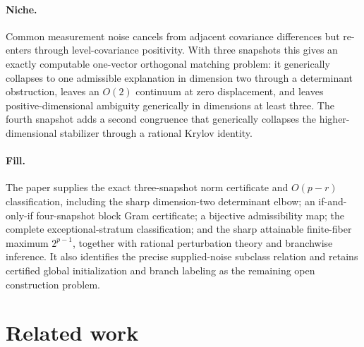 \documentclass{article}
\begin{document}
\paragraph{Niche.} Common measurement noise cancels from adjacent covariance differences but re-enters through level-covariance positivity.  With three snapshots this gives an exactly computable one-vector orthogonal matching problem: it generically collapses to one admissible explanation in dimension two through a determinant obstruction, leaves an \(O(2)\) continuum at zero displacement, and leaves positive-dimensional ambiguity generically in dimensions at least three.  The fourth snapshot adds a second congruence that generically collapses the higher-dimensional stabilizer through a rational Krylov identity.

\paragraph{Fill.} The paper supplies the exact three-snapshot norm certificate and \(O(p-r)\) classification, including the sharp dimension-two determinant elbow; an if-and-only-if four-snapshot block Gram certificate; a bijective admissibility map; the complete exceptional-stratum classification; and the sharp attainable finite-fiber maximum \(2^{p-1}\), together with rational perturbation theory and branchwise inference.  It also identifies the precise supplied-noise subclass relation and retains certified global initialization and branch labeling as the remaining open construction problem.

\section{Related work}
\end{document}
